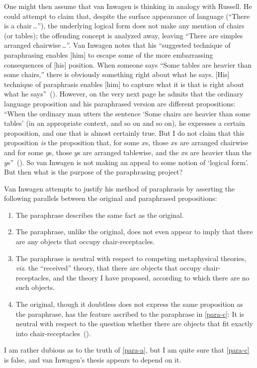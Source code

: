 \documentclass[11pt]{article}
\begin{document}
\begin{spacing}{1.5}
One might then assume that van Inwagen is thinking in analogy with Russell. He could attempt to claim that, despite the surface appearance of language (``There is a chair\,\ldots ''), the underlying logical form does not make any mention of chairs (or tables); the offending concept is analyzed away, leaving ``There are simples arranged chairwise\,\ldots ''. Van Inwagen notes that his ``suggested technique of paraphrasing enables [him] to escape some of the more embarrassing consequences of [his] position. When someone says ``Some tables are heavier than some chairs,'' there is obviously something right about what he says. [His] technique of paraphrasis enables [him] to capture what it is that is right about what he says''~(\citeyear[111]{inwagen1995}). However, on the very next page he admits that the ordinary language proposition and his paraphrased version are different propositions: ``When the ordinary man utters the sentence `Some chairs are heavier than some tables' (in an appropriate context, and so on and so on), he expresses a certain proposition, and one that is almost certainly true. But I do not claim that this proposition {\em is} the proposition that, for some $x$s, those $x$s are arranged chairwise and for some $y$s, those $y$s are arranged tablewise, and the $x$s are heavier than the $y$s''~(\citeyear[112]{inwagen1995}). So van Inwagen is not making an appeal to some notion of `logical form'. But then what is the purpose of the paraphrasing project?

Van Inwagen attempts to justify his method of paraphrasis by asserting the following parallels between the original and paraphrased propositions:
\begin{enumerate}[label=(\Alph*)]
	\item The paraphrase describes the same fact as the original. \label{para-a}
	\item The paraphrase, unlike the original, does not even appear to imply that there are any objects that occupy chair-receptacles.
	\item The paraphrase is neutral with respect to competing metaphysical theories, {\em viz}. the ``received'' theory, that there are objects that occupy chair-receptacles, and the theory I have proposed, according to which there are no such objects. \label{para-c}
	\item The original, though it doubtless does not express the same proposition as the paraphrase, has the feature ascribed to the paraphrase in \ref{para-c}: It is neutral with respect to the question whether there are objects that fit exactly into chair-receptacles~(\citeyear[113]{inwagen1995}).
\end{enumerate}
I am rather dubious as to the truth of \ref{para-a}, but I am quite sure that \ref{para-c} is false, and van Inwagen's thesis appears to depend on it.


\end{spacing}
\end{document}

